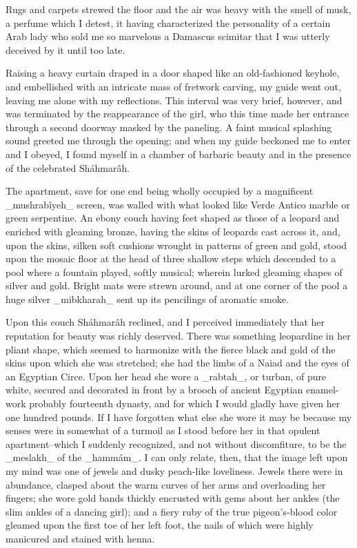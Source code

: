 Rugs and carpets strewed the floor and the air was heavy with the
smell of musk, a perfume which I detest, it having characterized the
personality of a certain Arab lady who sold me so marvelous a Damascus
scimitar that I was utterly deceived by it until too late.

Raising a heavy curtain draped in a door shaped like an old-fashioned
keyhole, and embellished with an intricate mass of fretwork carving,
my guide went out, leaving me alone with my reflections. This interval
was very brief, however, and was terminated by the reappearance of the
girl, who this time made her entrance through a second doorway masked
by the paneling. A faint musical splashing sound greeted me through
the opening; and when my guide beckoned me to enter and I obeyed,
I found myself in a chamber of barbaric beauty and in the presence
of the celebrated Sháhmarâh.

The apartment, save for one end being wholly occupied by a magnificent
_mushrabîyeh_ screen, was walled with what looked like Verde Antico
marble or green serpentine. An ebony couch having feet shaped as those
of a leopard and enriched with gleaming bronze, having the skins of
leopards cast across it, and, upon the skins, silken soft cushions
wrought in patterns of green and gold, stood upon the mosaic floor at
the head of three shallow steps which descended to a pool where a
fountain played, softly musical; wherein lurked gleaming shapes of
silver and gold. Bright mats were strewn around, and at one corner of
the pool a huge silver _mibkharah_ sent up its pencilings of aromatic
smoke.

Upon this couch Sháhmarâh reclined, and I perceived immediately that
her reputation for beauty was richly deserved. There was something
leopardine in her pliant shape, which seemed to harmonize with the
fierce black and gold of the skins upon which she was stretched; she
had the limbs of a Naiad and the eyes of an Egyptian Circe. Upon her
head she wore a _rabtah_, or turban, of pure white, secured and
decorated in front by a brooch of ancient Egyptian enamel-work
probably fourteenth dynasty, and for which I would gladly have given
her one hundred pounds. If I have forgotten what else she wore it may
be because my senses were in somewhat of a turmoil as I stood before
her in that opulent apartment--which I suddenly recognized, and not
without discomfiture, to be the _meslakh_ of the _hammám_. I can only
relate, then, that the image left upon my mind was one of jewels and
dusky peach-like loveliness. Jewels there were in abundance, clasped
about the warm curves of her arms and overloading her fingers; she
wore gold bands thickly encrusted with gems about her ankles (the slim
ankles of a dancing girl); and a fiery ruby of the true pigeon's-blood
color gleamed upon the first toe of her left foot, the nails of which
were highly manicured and stained with henna.

